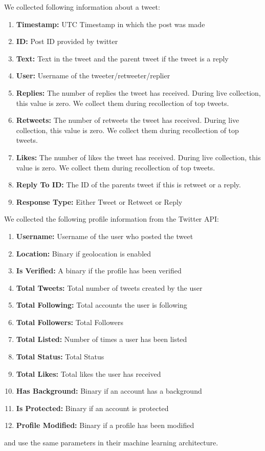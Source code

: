 \documentclass[letterpaper]{article}
\begin{document}
We collected following information about a tweet:
\begin{enumerate}[label=\textbf{\arabic*}]
    \item \textbf{Timestamp:} UTC Timestamp in which the post was made
    \item \textbf{ID:} Post ID provided by twitter
    \item \textbf{Text:} Text in the tweet and the parent tweet if the tweet is a reply
    \item \textbf{User:} Username of the tweeter/retweeter/replier
    \item \textbf{Replies:} The number of replies the tweet has received. During live collection, this value is zero. We collect them during recollection of top tweets.
    \item \textbf{Retweets:} The number of retweets the tweet has received. During live collection, this value is zero. We collect them during recollection of top tweets.
    \item \textbf{Likes:} The number of likes the tweet has received. During live collection, this value is zero. We collect them during recollection of top tweets.
    \item \textbf{Reply To ID:} The ID of the parents tweet if this is retweet or a reply.
    \item \textbf{Response Type:} Either Tweet or Retweet or Reply
\end{enumerate}
\bigskip

We collected the following profile information from the Twitter API:
\begin{enumerate}[label=\textbf{\arabic*}]
    \item \textbf{Username:} Username of the user who posted the tweet
    \item \textbf{Location:} Binary if geolocation is enabled
    \item \textbf{Is Verified:} A binary if the profile has been verified
    \item \textbf{Total Tweets:} Total number of tweets created by the user
    \item \textbf{Total Following:} Total accounts the user is following
    \item \textbf{Total Followers:} Total Followers
    \item \textbf{Total Listed:} Number of times a user has been listed
    \item \textbf{Total Status:} Total Status
    \item \textbf{Total Likes:} Total likes the user has received
    \item \textbf{Has Background:}  Binary if an account has a background
    \item \textbf{Is Protected:}  Binary if an account is protected
    \item \textbf{Profile Modified:}  Binary if a profile has been modified
\end{enumerate}
\bigskip
\cite{kudugunta2018deep} and \cite{ferrara2017disinformation} use the same parameters in their machine learning architecture. \par
\end{document}
